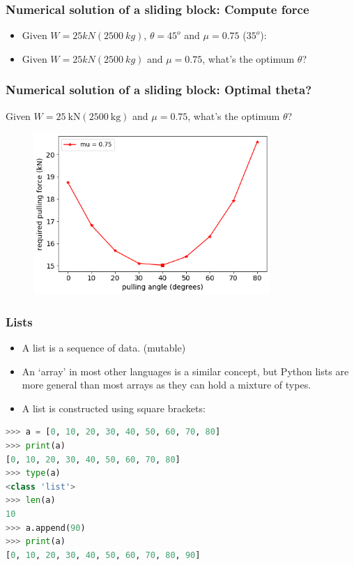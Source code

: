 \documentclass[notes]{beamer}
\begin{document}
\begin{frame}
	\frametitle{Numerical solution of a sliding block: Compute force}
	\begin{itemize}
		\item Given $W = 25 kN (\SI{2500}{kg})$, $\theta = 45^o$ and $\mu = 0.75$ ($35^o$):
		\mode<beamer>{	
			\begin{equation*}
			F = \frac{0.75 \times 25 }{\cos(45) + 0.75 \sin(45)} = \SI{15.15}{kN}.
			\end{equation*}
		}
		\mode<handout>{
			\vspace{2.5cm}
		}
		\item Given $W = 25 kN (\SI{2500}{kg})$ and $\mu = 0.75$, what's the optimum $\theta$?
	\end{itemize}
\end{frame}

\begin{frame}
	\frametitle{\faCommentsO Numerical solution of a sliding block: Optimal theta?}
	Given $W = \SI{25}{\kilo\newton} (\SI{2500}{\kilogram})$ and $\mu = 0.75$, what's the optimum $\theta$?
	\begin{figure}[ht]
		\centering
		\includegraphics[width=0.8\textwidth]{figs/sliding-block-mu0p75-10.png}
	\end{figure}
\end{frame}

\begin{frame}[fragile]
	\frametitle{Lists}
	\begin{itemize}
		\item A list is a sequence of data. (mutable)
		\item An `array' in most other languages is a similar concept, but Python lists are more general than most arrays as they can hold a mixture of types. 
		\item A list is constructed using square brackets:
	\end{itemize}
	\begin{lstlisting}[language=Python]
>>> a = [0, 10, 20, 30, 40, 50, 60, 70, 80]
>>> print(a)
[0, 10, 20, 30, 40, 50, 60, 70, 80]
>>> type(a)
<class 'list'>
>>> len(a)
10
>>> a.append(90)
>>> print(a)
[0, 10, 20, 30, 40, 50, 60, 70, 80, 90]
	\end{lstlisting}
\end{frame}
\end{document}

